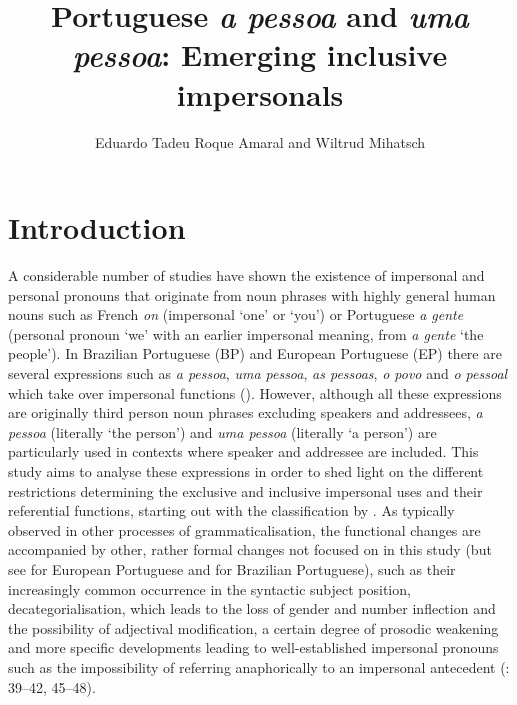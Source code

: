 \documentclass[output=paper]{langscibook}
\author{Eduardo Tadeu Roque Amaral\affiliation{Universidade Federal de Minas Gerais} and Wiltrud Mihatsch\orcid{}\affiliation{Universität Tübingen}}
\title{Portuguese \textit{a pessoa} and \textit{uma pessoa}: Emerging inclusive impersonals}
\begin{document}
\maketitle

\section{Introduction}

A considerable number of studies have shown the existence of impersonal and personal pronouns that originate from noun phrases with highly general human nouns such as French {\textit{on}} {(impersonal ‘one’ or ‘you’) or Portuguese} {\textit{a gente}} {(personal pronoun ‘we’ with an earlier impersonal meaning, from} {\textit{a gente}} {‘the people’). In Brazilian Portuguese (BP) and European Portuguese (EP) there are several expressions such as} {\textit{a pessoa}},{ \textit{uma pessoa}},{ \textit{as pessoas}},{ \textit{o povo} }{and}{ \textit{o pessoal}} {which take over impersonal functions (\citealt{AmaralMihatsch2019, Posio2021}). However, although all these expressions are originally third person noun phrases excluding speakers and addressees,} {\textit{a pessoa}} {(literally ‘the person’) and} {\textit{uma pessoa} }{(literally ‘a person’) are particularly used in contexts where speaker and addressee are included. This study aims to analyse these expressions in order to shed light on the different restrictions determining the exclusive and inclusive impersonal uses and their referential functions, starting out with the classification by \citet{GastvanderAuwera2013}. As typically observed in other processes of grammaticalisation, the functional changes are accompanied by other, rather formal changes not focused on in this study (but see \citealt{Posio2021} for European Portuguese and \citealt{AmaralMihatsch2019} for Brazilian Portuguese), such as their increasingly common occurrence in the syntactic subject position, decategorialisation, which leads to the loss of gender and number inflection and the possibility of adjectival modification, a certain degree of prosodic weakening \citep{Posio2021} and more specific developments leading to well-established impersonal pronouns such as the impossibility of referring anaphorically to an impersonal antecedent (\citealt{CabredoHofherr2008}: 39--42, 45--48).}
\end{document}
